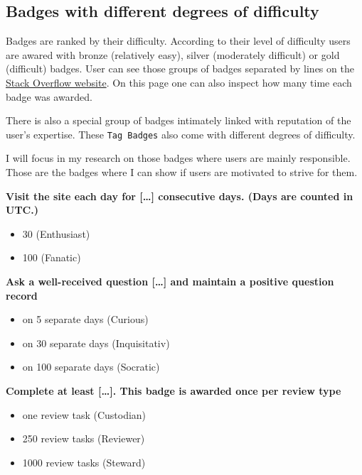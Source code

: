 \documentclass[]{book}
\providecommand{\tightlist}{%
  \setlength{\itemsep}{0pt}\setlength{\parskip}{0pt}}
\theoremstyle{definition}
\theoremstyle{definition}
\theoremstyle{definition}
\theoremstyle{remark}
\begin{document}
\subsection{Badges with different degrees of
difficulty}\label{badges-with-different-degrees-of-difficulty}

Badges are ranked by their difficulty. According to their level of
difficulty users are awared with bronze (relatively easy), silver
(moderately difficult) or gold (difficult) badges. User can see those
groups of badges separated by lines on the
\href{https://stackoverflow.com/help/badges}{Stack Overflow website}. On
this page one can also inspect how many time each badge was awarded.

There is also a special group of badges intimately linked with
reputation of the user's expertise. These \texttt{Tag\ Badges} also come
with different degrees of difficulty.

I will focus in my research on those badges where users are mainly
responsible. Those are the badges where I can show if users are
motivated to strive for them.

\textbf{Visit the site each day for {[}\ldots{}{]} consecutive days.
(Days are counted in UTC.)}

\begin{itemize}
\tightlist
\item
  30 (Enthusiast)
\item
  100 (Fanatic)
\end{itemize}

\textbf{Ask a well-received question {[}\ldots{}{]} and maintain a
positive question record}

\begin{itemize}
\tightlist
\item
  on 5 separate days (Curious)
\item
  on 30 separate days (Inquisitativ)
\item
  on 100 separate days (Socratic)
\end{itemize}

\textbf{Complete at least {[}\ldots{}{]}. This badge is awarded once per
review type}

\begin{itemize}
\tightlist
\item
  one review task (Custodian)
\item
  250 review tasks (Reviewer)
\item
  1000 review tasks (Steward)
\end{itemize}
\end{document}
